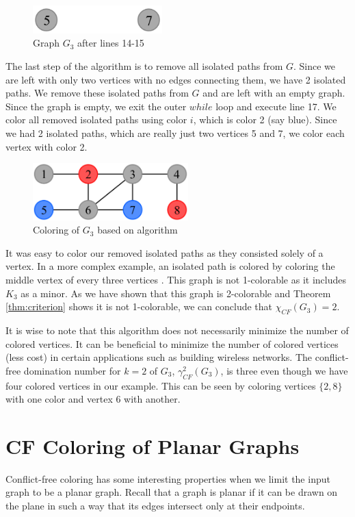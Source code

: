 \documentclass{sig-alternate}
\begin{document}
\begin{figure}[h]
	\centering
	\includegraphics[width=5cm]{../figures/algorithm1-step2.pdf}
	\caption{Graph $G_3$ after lines 14-15}\label{fig:algorithm1-step2}
\end{figure}

The last step of the algorithm is to remove all isolated paths from $G$. Since we are left with only two vertices with no edges connecting them, we have 2 isolated paths. We remove these isolated paths from $G$ and are left with an empty graph. Since the graph is empty, we exit the outer $while$ loop and execute line 17. We color all removed isolated paths using color $i$, which is color 2 (say blue). Since we had 2 isolated paths, which are really just two vertices 5 and 7, we color each vertex with color 2.

\begin{figure}[h]
	\centering
	\includegraphics[width=6cm]{../figures/algorithm1-step3.pdf}
	\caption{Coloring of $G_3$ based on algorithm}\label{fig:algorithm1-step3}
\end{figure}

It was easy to color our removed isolated paths as they consisted solely of a vertex. In a more complex example, an isolated path is colored by coloring the middle vertex of every three vertices \cite{abel2017three}. This graph is not 1-colorable as it includes $K_3$ as a minor. As we have shown that this graph is 2-colorable and Theorem \ref{thm:criterion} shows it is not 1-colorable, we can conclude that $\chi_{CF}(G_3) = 2$.

It is wise to note that this algorithm does not necessarily minimize the number of colored vertices. It can be beneficial to minimize the number of colored vertices (less cost) in certain applications such as building wireless networks. The conflict-free domination number for $k=2$ of $G_3$, $\gamma_{CF}^2(G_3)$, is three even though we have four colored vertices in our example. This can be seen by coloring vertices $\{2, 8\}$ with one color and vertex 6 with another.

\section{CF Coloring of Planar Graphs}
\label{sec:planar-coloring}
Conflict-free coloring has some interesting properties when we limit the input graph to be a planar graph. Recall that a graph is planar if it can be drawn on the plane in such a way that its edges intersect only at their endpoints.
\end{document}
